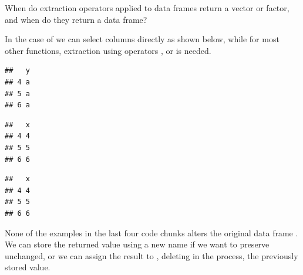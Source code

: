 \documentclass[krantz2]{krantz}\usepackage{knitr}
\begin{document}
\begin{advplayground}
When do extraction operators applied to data frames return a vector or factor, and when do they return a data frame?
\end{advplayground}

\begin{explainbox}
In the case of  we can select columns directly as shown below, while for most other functions, extraction using operators \Roperator{[ ]}, \Roperator{[[ ]]} or \Roperator{\$} is needed.

\begin{knitrout}\footnotesize
{}\color{fgcolor}\begin{kframe}
\begin{alltt}
 \hlopt{>} \hlstd{,}  \hlstd{=} \hlstd{)}
\end{alltt}
\begin{verbatim}
##   y
## 4 a
## 5 a
## 6 a
\end{verbatim}
\begin{alltt}
 \hlopt{>} \hlstd{,}  
\end{alltt}
\begin{verbatim}
##   x
## 4 4
## 5 5
## 6 6
\end{verbatim}
\begin{alltt}
 \hlopt{>} \hlstd{,}  \hlstd{=} \hlstd{)}
\end{alltt}
\begin{verbatim}
##   x
## 4 4
## 5 5
## 6 6
\end{verbatim}
\end{kframe}
\end{knitrout}
\end{explainbox}

None of the examples in the last four code chunks alters the original data frame . We can store the returned value using a new name if we want to preserve  unchanged, or we can assign the result to , deleting in the process, the previously stored value.
\end{document}
